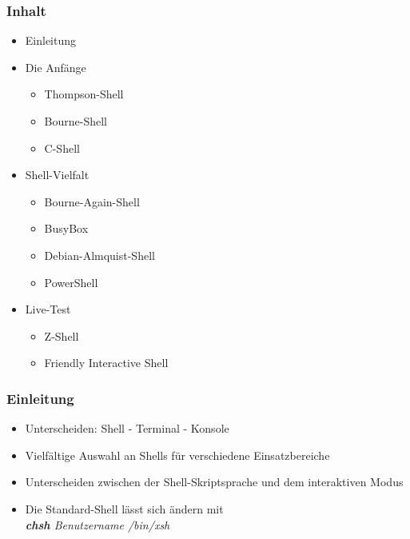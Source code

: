 \begin{frame}
    \titlepage
\end{frame}

\begin{frame}
    \frametitle{Inhalt}
    \begin{itemize}
        \item Einleitung
        \item Die Anfänge
        \begin{itemize}
            \item Thompson-Shell
            \item Bourne-Shell
            \item C-Shell
        \end{itemize}
        \pause
        \item Shell-Vielfalt
        \begin{itemize}
            \item Bourne-Again-Shell
            \item BusyBox
            \item Debian-Almquist-Shell
            \item PowerShell
        \end{itemize}
        \pause
        \item Live-Test
        \begin{itemize}
            \item Z-Shell
            \item Friendly Interactive Shell
        \end{itemize}
    \end{itemize}
\end{frame}

\begin{frame}
    \frametitle{Einleitung}
    \begin{itemize}
        \item Unterscheiden: Shell - Terminal - Konsole
        \item Vielfältige Auswahl an Shells für verschiedene Einsatzbereiche
        \item Unterscheiden zwischen der Shell-Skriptsprache und dem interaktiven Modus
        \item Die Standard-Shell lässt sich ändern mit\\\textit{\textbf{chsh} Benutzername /bin/xsh}
    \end{itemize}
\end{frame}
